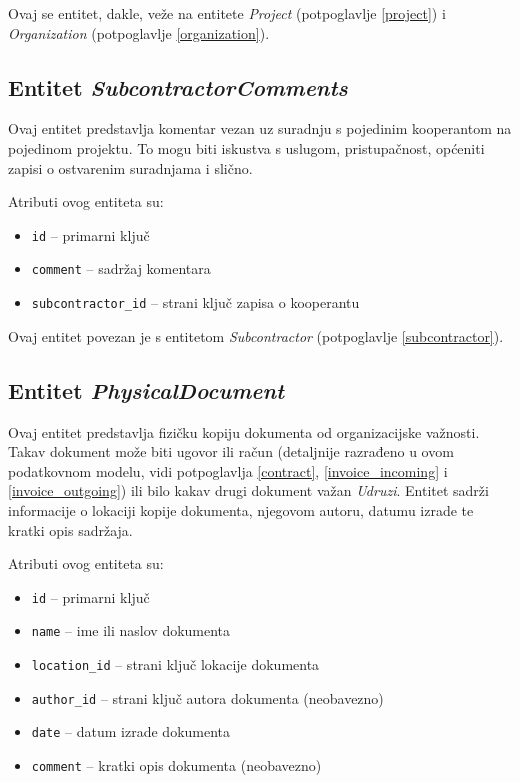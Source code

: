 \documentclass[times, utf8, diplomski]{fer}
\begin{document}
Ovaj se entitet, dakle, veže na entitete \emph{Project} (potpoglavlje
\ref{project}) i \emph{Organization} (potpoglavlje \ref{organization}).

\subsection{Entitet \emph{SubcontractorComments}} \label{subcontractor_comments}

Ovaj entitet predstavlja komentar vezan uz suradnju s pojedinim kooperantom na
pojedinom projektu. To mogu biti iskustva s uslugom, pristupačnost, općeniti
zapisi o ostvarenim suradnjama i slično.

\medskip
Atributi ovog entiteta su:
\begin{itemize}
    \item \texttt{id} -- primarni ključ
    \item \texttt{comment} -- sadržaj komentara
    \item \texttt{subcontractor\_id} -- strani ključ zapisa o kooperantu
\end{itemize}

Ovaj entitet povezan je s entitetom \emph{Subcontractor} (potpoglavlje
\ref{subcontractor}).

\subsection{Entitet \emph{PhysicalDocument}} \label{physical_document}

Ovaj entitet predstavlja fizičku kopiju dokumenta od organizacijske važnosti.
Takav dokument može biti ugovor ili račun (detaljnije razrađeno u ovom
podatkovnom modelu, vidi potpoglavlja \ref{contract}, \ref{invoice_incoming} i
\ref{invoice_outgoing}) ili bilo kakav drugi dokument važan \emph{Udruzi}.
Entitet sadrži informacije o lokaciji kopije dokumenta, njegovom autoru, datumu
izrade te kratki opis sadržaja.

\medskip
Atributi ovog entiteta su:
\begin{itemize}
    \item \texttt{id} -- primarni ključ
    \item \texttt{name} -- ime ili naslov dokumenta
    \item \texttt{location\_id} -- strani ključ lokacije dokumenta
    \item \texttt{author\_id} -- strani ključ autora dokumenta (neobavezno)
    \item \texttt{date} -- datum izrade dokumenta
    \item \texttt{comment} -- kratki opis dokumenta (neobavezno)
\end{itemize}
\end{document}
